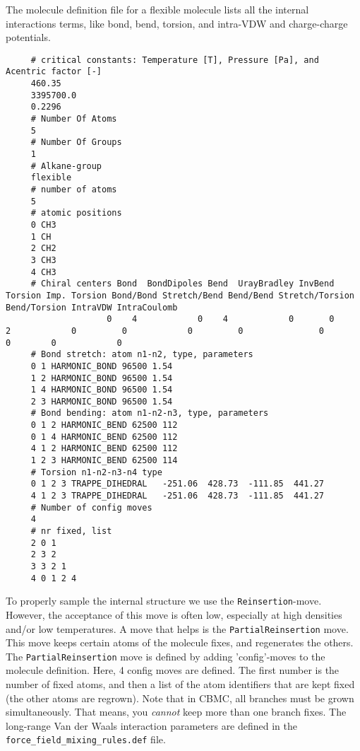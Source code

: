 \noindent
The molecule definition file for a flexible molecule lists all the internal interactions terms, like bond, bend, torsion,
and intra-VDW and charge-charge potentials.
\begin{tiny}
\begin{verbatim}
     # critical constants: Temperature [T], Pressure [Pa], and Acentric factor [-]
     460.35
     3395700.0
     0.2296
     # Number Of Atoms
     5
     # Number Of Groups
     1
     # Alkane-group
     flexible
     # number of atoms
     5
     # atomic positions
     0 CH3
     1 CH
     2 CH2
     3 CH3
     4 CH3
     # Chiral centers Bond  BondDipoles Bend  UrayBradley InvBend  Torsion Imp. Torsion Bond/Bond Stretch/Bend Bend/Bend Stretch/Torsion Bend/Torsion IntraVDW IntraCoulomb
                    0    4            0    4            0       0        2            0         0            0         0               0            0        0            0
     # Bond stretch: atom n1-n2, type, parameters
     0 1 HARMONIC_BOND 96500 1.54
     1 2 HARMONIC_BOND 96500 1.54
     1 4 HARMONIC_BOND 96500 1.54
     2 3 HARMONIC_BOND 96500 1.54
     # Bond bending: atom n1-n2-n3, type, parameters
     0 1 2 HARMONIC_BEND 62500 112
     0 1 4 HARMONIC_BEND 62500 112
     4 1 2 HARMONIC_BEND 62500 112
     1 2 3 HARMONIC_BEND 62500 114
     # Torsion n1-n2-n3-n4 type
     0 1 2 3 TRAPPE_DIHEDRAL   -251.06  428.73  -111.85  441.27
     4 1 2 3 TRAPPE_DIHEDRAL   -251.06  428.73  -111.85  441.27
     # Number of config moves
     4
     # nr fixed, list
     2 0 1
     2 3 2
     3 3 2 1
     4 0 1 2 4
\end{verbatim}
\end{tiny}
To properly sample the internal structure we use the \verb+Reinsertion+-move.
However, the acceptance of this move is often low, especially at high densities and/or low temperatures.
A move that helps is the \verb+PartialReinsertion+ move. This move keeps certain atoms of the molecule fixes, and
regenerates the others. The \verb+PartialReinsertion+ move is defined by adding 'config'-moves to the molecule definition.
Here, 4 config moves are defined. The first number is the number of fixed atoms, and then a list of the atom identifiers that are kept fixed
(the other atoms are regrown). Note that in CBMC, all branches must be grown simultaneously. That means, you \emph{cannot} keep more than one branch fixes.
The long-range Van der Waals interaction parameters are defined in the \verb+force_field_mixing_rules.def+ file.
